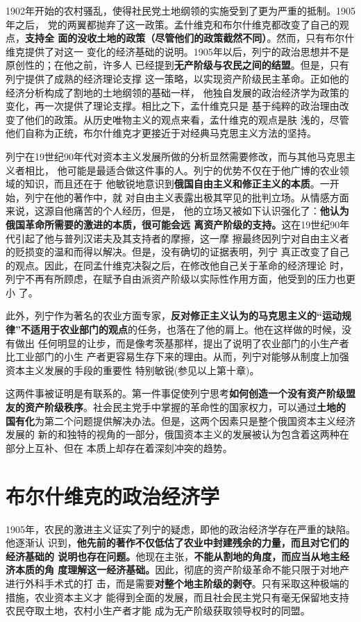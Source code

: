 1902年开始的农村骚乱，使得社民党土地纲领的实施受到了更为严重的抵制。1905年之后，
党的两翼都抛弃了这一政策。孟什维克和布尔什维克都改变了自己的观点，\textbf{支持全
  面的没收土地的政策（尽管他们的政策截然不同）}。然而，只有布尔什维克提供了对这一
变化的经济基础的说明。1905年以后，列宁的政治思想并不是原创性的；在他之前，许多人
已经提到\textbf{无产阶级与农民之间的结盟}。但是，只有列宁提供了成熟的经济理论支撑
这一策略，以实现资产阶级民主革命。正如他的经济分析构成了割地的土地纲领的基础一样，
他独自发展的政治经济学为政策的变化，再一次提供了理论支撑。相比之下，孟什维克只是
基于纯粹的政治理由改变了他们的政策。从历史唯物主义的观点来看，孟什维克的观点是肤
浅的，尽管他们自称为正统，布尔什维克才更接近于对经典马克思主义方法的坚持。

列宁在19世纪90年代对资本主义发展所做的分析显然需要修改，而与其他马克思主义者相比，
他可能是最适合做这件事的人。列宁的优势不仅在于他广博的农业领域的知识，而且还在于
他敏锐地意识到\textbf{俄国自由主义和修正主义的本质}。一开始，列宁在他的著作中，就
对自由主义表露出极其罕见的批判立场。从情感方面来说，这源自他痛苦的个人经历，但是，
他的立场又被如下认识强化了：\textbf{他认为俄国革命所需要的激进的本质，很可能会远
  离资产阶级的支持。}这在19世纪90年代引起了他与普列汉诺夫及其支持者的摩擦，这一摩
擦最终因列宁对自由主义者的贬损变的温和而得以解决。但是，没有确切的证据表明，列宁
真正改变了自己的观点。因此，在同孟什维克决裂之后，在修改他自己关于革命的经济理论
时，列宁不再有所顾虑，在赋予自由派资产阶级以实际性作用方面，他受到的压力也更小
了。

此外，列宁作为著名的农业方面专家，\textbf{反对修正主义认为的马克思主义的“运动规
  律”不适用于农业部门的观点}的任务，也落在了他的肩上。他在这样做的时候，没有做出
任何明显的让步，而是像考茨基那样，提出了说明了农业部门的小生产者比工业部门的小生
产者更容易生存下来的理由。从而，列宁对能够从制度上加强资本主义发展的手段的重要性
特别敏锐(参见以上第十章)。

这两件事被证明是有联系的。第一件事促使列宁思考\textbf{如何创造一个没有资产阶级盟
  友的资产阶级秩序}。社会民主党手中掌握的革命性的国家权力，可以通过\textbf{土地的
  国有化}为第二个问题提供解决办法。但是，这两个因素只是整个俄国资本主义经济发展的
新的和独特的视角的一部分，俄国资本主义的发展被认为包含着这两种在部分上互补、但在
本质上却存在着深刻冲突的趋势。

\section{布尔什维克的政治经济学}

1905年，农民的激进主义证实了列宁的疑虑，即他的政治经济学存在严重的缺陷。他逐渐认
识到，\textbf{他先前的著作不仅低估了农业中封建残余的力量，而且对它们的经济基础的
  说明也存在问题。}他现在主张，\textbf{不能从割地的角度，而应当从地主经济本质的角
  度理解这一经济基础。}因此，彻底的资产阶级革命不能只限于对地产进行外科手术式的打
击，而是需要\textbf{对整个地主阶级的剥夺}。只有采取这种极端的措施，农业资本主义才
能得到全面的发展，而且社会民主党只有毫无保留地支持农民夺取土地，农村小生产者才能
成为无产阶级获取领导权时的同盟。

